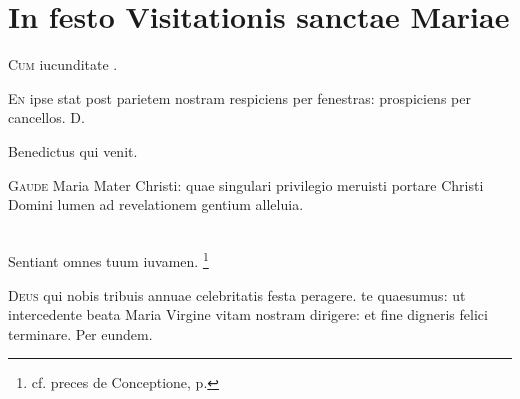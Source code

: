\chapter{In festo Visitationis sanctae Mariae}
\label{form:visitatio}

\lettrine{C}{um} iucunditate .

\lettrine{E}{n} ipse stat post parietem nostram respiciens per fenestras:
prospiciens per cancellos.
D.


 Benedictus qui venit.

\lettrine{G}{aude} Maria Mater Christi:
quae singulari privilegio meruisti
portare Christi Domini
lumen ad revelationem gentium alleluia.

\\
Sentiant omnes tuum iuvamen.
\footnote{%
cf. preces de Conceptione, p. \pageref{form:conceptio}}

\lettrine{D}{eus} qui nobis tribuis annuae celebritatis festa peragere.
te quaesumus:
ut intercedente beata Maria Virgine
vitam nostram dirigere:
et fine digneris felici terminare.
Per eundem.


\headingCantus




